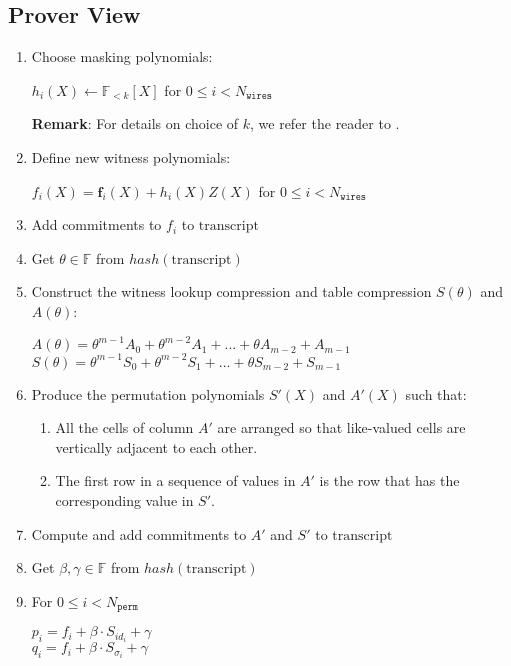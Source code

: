 \subsection{Prover View}
\begin{enumerate}
	\item Choose masking polynomials: 
	\begin{center}
		$h_i(X) \leftarrow \mathbb{F}_{<k}[X]$ for $0 \leq i < N_{\texttt{wires}}$
	\end{center}
	\textbf{Remark}: For details on choice of $k$, we refer the reader to \cite{cryptoeprint:2019:1400}.
	\item Define new witness polynomials:
	\begin{center}
		$f_i(X) = \textbf{f}_{i}(X) + h_i(X)Z(X)$ for $0 \leq i < N_{\texttt{wires}}$
	\end{center}
	\item Add commitments to $f_i$ to $\text{transcript}$
	\item Get $\theta \in \mathbb{F}$ from $hash(\text{transcript})$
	\item Construct the witness lookup compression and table compression $S(\theta)$ and $A(\theta)$:
	\begin{center}
		$A(\theta) = \theta^{m - 1} A_{0} + \theta^{m - 2} A_{1} + ... + \theta A_{ m - 2} + A_{m - 1}$ \\
		$S(\theta) = \theta^{m-1} S_{0} + \theta^{m-2} S_{1} + ... + \theta S_{m-2} + S_{m-1}$
	\end{center}
	\item Produce the permutation polynomials $S'(X)$ and $A'(X)$ such that:
	\begin{enumerate}
		\item All the cells of column $A'$ are arranged so that like-valued cells are vertically adjacent to each other. 
		\item The first row in a sequence of values in $A'$ is the row that has the corresponding value in $S'$.
	\end{enumerate}
	\item Compute and add commitments to $A'$ and $S'$ to $\text{transcript}$
	\item Get $\beta, \gamma \in \mathbb{F}$ from $hash(\text{transcript})$
	\item For $0 \leq i < N_{\texttt{perm}}$
	\begin{center}
		$p_i = f_i + \beta \cdot S_{id_i} + \gamma$ \\
		$q_i = f_i + \beta \cdot S_{\sigma_i} + \gamma$
	\end{center}

\end{enumerate}
